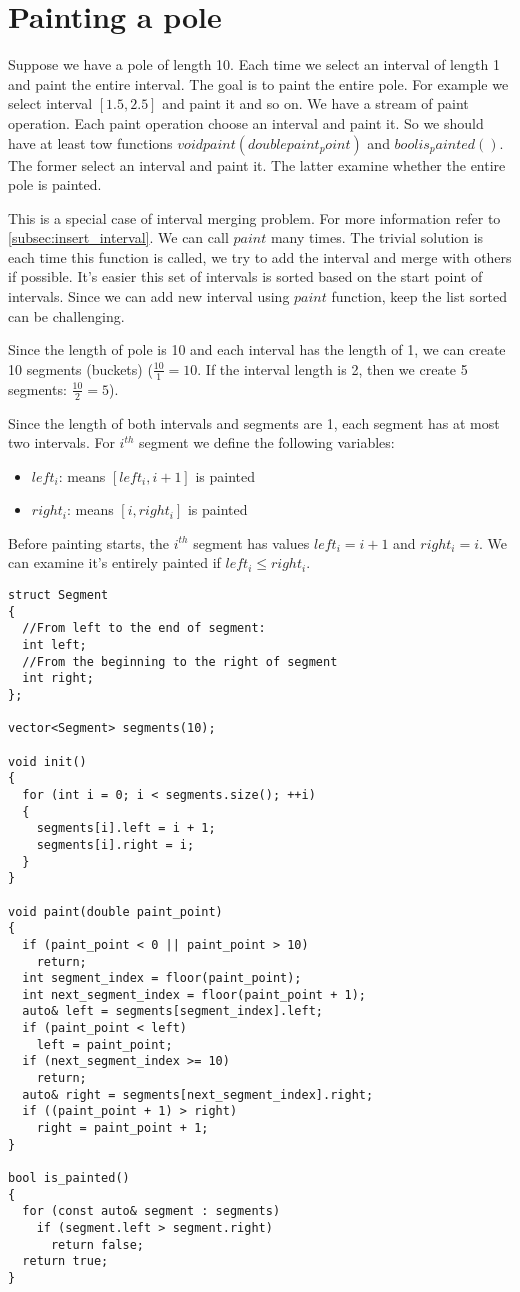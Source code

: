 \documentclass{book}
\begin{document}
	\section{Painting a pole}
	\label{sec:painting_a_pole}
	Suppose we have a pole of length 10. Each time we select an interval of length 1 and paint the entire interval. The goal is to paint the entire pole. For example we select interval $[1.5, 2.5]$ and paint it and so on. We have a stream of paint operation. Each paint operation choose an interval and paint it. So we should have at least tow functions $void paint(double paint_point)$ and $bool is_painted()$. The former select an interval and paint it. The latter examine whether the entire pole is painted.
	\par This is a special case of interval merging problem. For more information refer to \ref{subsec:insert_interval}. We can call $paint$ many times. The trivial solution is each time this function is called, we try to add the interval and merge with others if possible. It's easier this set of intervals is sorted based on the start point of intervals. Since we can add new interval using $paint$ function, keep the list sorted can be challenging.
	\par Since the length of pole is 10 and each interval has the length of 1, we can create 10 segments (buckets) ($\frac{10}{1} = 10$. If the interval length is 2, then we create 5 segments: $\frac{10}{2} = 5$).
	\par Since the length of both intervals and segments are 1, each segment has at most two intervals. For $i^{th}$ segment we define the following variables:
	\begin{itemize}
		\item $left_i$: means $[left_i, i + 1]$ is painted
		\item $right_i$: means $[i, right_i]$ is painted
	\end{itemize}
	Before painting starts, the $i^{th}$ segment has values $left_i = i + 1$ and $right_i = i$. We can examine it's entirely painted if $left_i \le right_i$.
	\begin{lstlisting}
struct Segment
{
  //From left to the end of segment:
  int left;
  //From the beginning to the right of segment
  int right;
};

vector<Segment> segments(10);

void init()
{
  for (int i = 0; i < segments.size(); ++i)
  {
    segments[i].left = i + 1;
    segments[i].right = i;
  }
}

void paint(double paint_point)
{
  if (paint_point < 0 || paint_point > 10)
    return;
  int segment_index = floor(paint_point);
  int next_segment_index = floor(paint_point + 1);
  auto& left = segments[segment_index].left;
  if (paint_point < left)
    left = paint_point;
  if (next_segment_index >= 10)
    return;
  auto& right = segments[next_segment_index].right;
  if ((paint_point + 1) > right)
    right = paint_point + 1;
}

bool is_painted()
{
  for (const auto& segment : segments)
    if (segment.left > segment.right)
      return false;
  return true;
}
	\end{lstlisting}
	\appendix
\end{document}
